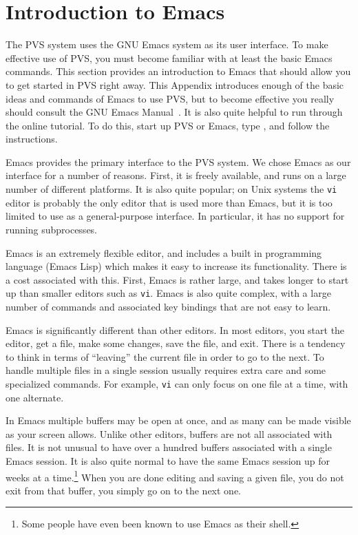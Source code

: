\chapter{Introduction to Emacs}
\label{emacs-intro}

The PVS system uses the GNU Emacs system as its user interface.  To make
effective use of PVS, you must become familiar with at least the basic
Emacs commands.  This section provides an introduction to Emacs that
should allow you to get started in PVS right away.  This Appendix
introduces enough of the basic ideas and commands of Emacs to use PVS, but
to become effective you really should consult the GNU Emacs
Manual~\cite{emacs20}.  It is also quite helpful to run through the online
tutorial.  To do this, start up PVS or Emacs, type , and follow
the instructions.

Emacs provides the primary interface to the PVS system.  We chose Emacs
as our interface for a number of reasons.  First, it is freely available,
and runs on a large number of different platforms.  It is also quite
popular; on Unix systems the \texttt{vi} editor is probably the only
editor that is used more than Emacs, but it is too limited to use as a
general-purpose interface.  In particular, it has no support for running
subprocesses.

Emacs is an extremely flexible editor, and includes a built in programming
language (Emacs Lisp) which makes it easy to increase its functionality.
There is a cost associated with this.  First, Emacs is rather large, and
takes longer to start up than smaller editors such as \texttt{vi}.  Emacs
is also quite complex, with a large number of commands and associated key
bindings that are not easy to learn.

Emacs is significantly different than other editors.  In most editors, you
start the editor, get a file, make some changes, save the file, and exit.
There is a tendency to think in terms of ``leaving'' the current file in
order to go to the next. To handle multiple files in a single session
usually requires extra care and some specialized commands.  For example,
\texttt{vi} can only focus on one file at a time, with one alternate.

In Emacs multiple buffers may be open at once, and as many can be made
visible as your screen allows.  Unlike other editors, buffers are not all
associated with files.  It is not unusual to have over a hundred buffers
associated with a single Emacs session.  It is also quite normal to have
the same Emacs session up for weeks at a time.\footnote{Some people have
even been known to use Emacs as their shell.}  When you are done editing
and saving a given file, you do not exit from that buffer, you simply go
on to the next one.

